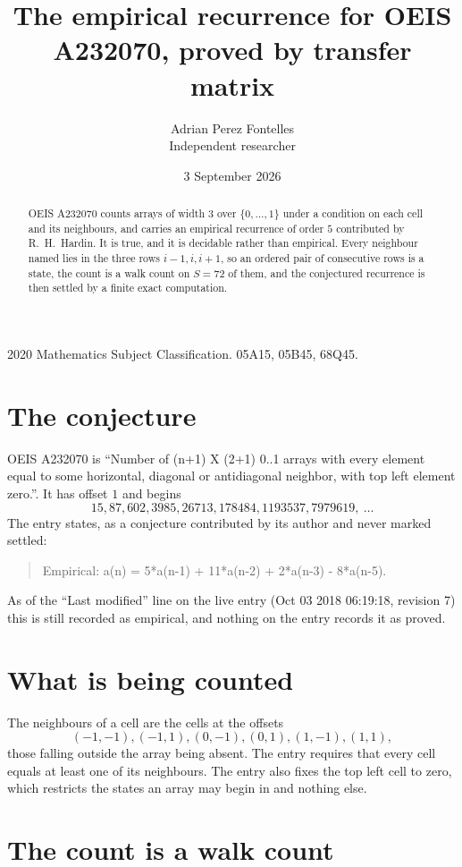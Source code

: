 \documentclass[11pt,a4paper]{article}
\title{The empirical recurrence for OEIS A232070, proved by transfer matrix}
\author{Adrian Perez Fontelles\\ \small Independent researcher}
\date{3 September 2026}
\theoremstyle{plain}
\theoremstyle{definition}
\begin{document}
\maketitle

\begin{abstract}
OEIS A232070 counts arrays of width $3$ over $\{0,\dots,1\}$ under a condition on each cell
and its neighbours, and carries an empirical recurrence of order $5$ contributed by
R.~H.~Hardin. It is true, and it is decidable rather than empirical. Every neighbour named lies
in the three rows $i-1,i,i+1$, so an ordered pair of consecutive rows is a state, the count is
a walk count on $S=72$ of them, and the conjectured recurrence is then settled by a finite
exact computation.
\end{abstract}

\noindent\small 2020 Mathematics Subject Classification. 05A15, 05B45, 68Q45.\normalsize

\section{The conjecture}

OEIS A232070 is ``Number of (n+1) X (2+1) 0..1 arrays with every element equal to some horizontal, diagonal or antidiagonal neighbor, with top left element zero.''. It has offset $1$ and begins
\[
15, 87, 602, 3985, 26713, 178484, 1193537, 7979619,\ \dots
\]
The entry states, as a conjecture contributed by its author and never marked settled:
\begin{quote}
Empirical: a(n) = 5*a(n-1) + 11*a(n-2) + 2*a(n-3) - 8*a(n-5).
\end{quote}
As of the ``Last modified'' line on the live entry (Oct 03 2018 06:19:18, revision 7) this is still
recorded as empirical, and nothing on the entry records it as proved.

\section{What is being counted}

The neighbours of a cell are the cells at the offsets
\[
(-1,-1), (-1,1), (0,-1), (0,1), (1,-1), (1,1),
\]
those falling outside the array being absent. The entry requires that every cell equals at least one of its neighbours. The entry also fixes the top left cell to zero, which restricts the states an array may begin in and nothing else.

\section{The count is a walk count}
\end{document}
